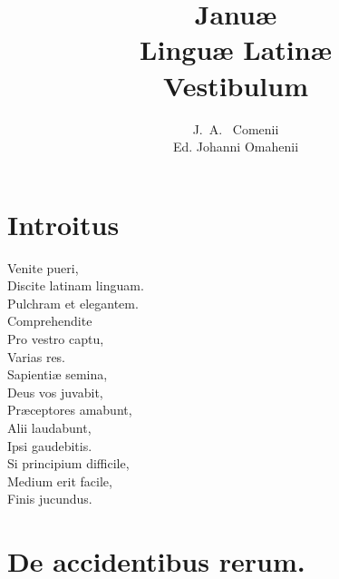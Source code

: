 \documentclass[12pt, twocolumn]{memoir}
\author{J.~A.~ Comenii\\
\small{Ed. Johanni Omahenii}}
\title{Januæ\\
Linguæ Latinæ\\
Vestibulum}
\begin{document}
\maketitle


\chapter{Introitus}
Venite pueri,\\
Discite latinam linguam.\\
Pulchram et elegantem.\\
Comprehendite\\
Pro vestro captu,\\
Varias res.\\
Sapientiæ semina,\\
Deus vos juvabit,\\
Præceptores amabunt,\\
Alii laudabunt,\\
Ipsi gaudebitis.\\
Si principium difficile,\\
Medium erit facile,\\
Finis jucundus.\\

\chapter{De accidentibus rerum.}
\end{document}
